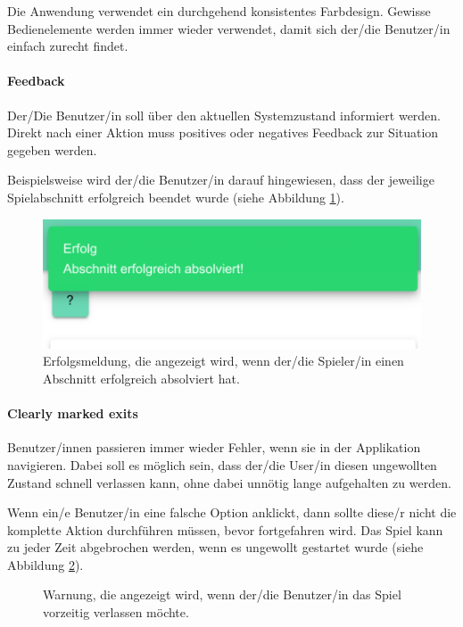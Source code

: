 Die Anwendung verwendet ein durchgehend konsistentes Farbdesign. Gewisse Bedienelemente werden immer wieder verwendet, damit sich der/die Benutzer/in einfach zurecht findet.

\paragraph{Feedback}
Der/Die Benutzer/in soll über den aktuellen Systemzustand informiert werden. Direkt nach einer Aktion muss positives oder negatives Feedback zur Situation gegeben werden. \cite{nielsen:1993:usability}

Beispielsweise wird der/die Benutzer/in darauf hingewiesen, dass der jeweilige Spielabschnitt erfolgreich beendet wurde (siehe Abbildung \ref{fig:game-success-message}).

\begin{figure}[H]
    \centering
	\includegraphics[width=0.5\linewidth]{figures/development/application/success-message.png}
	\caption{Erfolgsmeldung, die angezeigt wird, wenn der/die Spieler/in einen Abschnitt erfolgreich absolviert hat.}
	\label{fig:game-success-message}
\end{figure}

\paragraph{Clearly marked exits}
Benutzer/innen passieren immer wieder Fehler, wenn sie in der Applikation navigieren. Dabei soll es möglich sein, dass der/die User/in diesen ungewollten Zustand schnell verlassen kann, ohne dabei unnötig lange aufgehalten zu werden. \cite{nielsen:1993:usability}

Wenn ein/e Benutzer/in eine falsche Option anklickt, dann sollte diese/r nicht die komplette Aktion durchführen müssen, bevor fortgefahren wird. Das Spiel kann zu jeder Zeit abgebrochen werden, wenn es ungewollt gestartet wurde (siehe Abbildung \ref{fig:game-abort-page}).

\begin{figure}[H]
    \centering
	\caption{Warnung, die angezeigt wird, wenn der/die Benutzer/in das Spiel vorzeitig verlassen möchte.}
	\label{fig:game-abort-page}
\end{figure}

